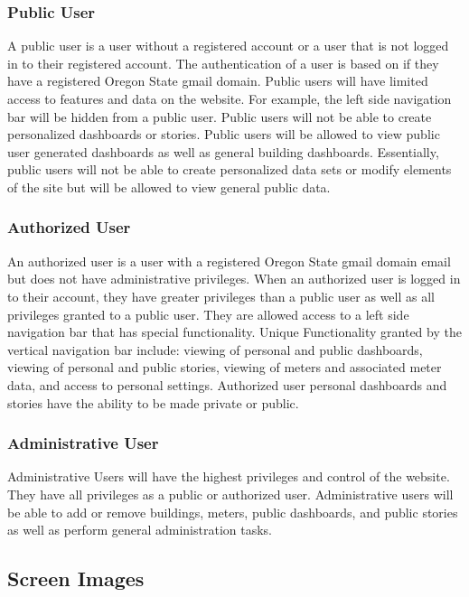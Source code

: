 \documentclass[journal,10pt,onecolumn,compsoc]{IEEEtran}
\begin{document}
	\subsubsection{Public User}
	A public user is a user without a registered account or a user that is not logged in to their registered account. The authentication of a user is based on if 
	they have a registered Oregon State gmail domain. Public users will have limited access to features and data on the website. For example, the left side navigation
	bar will be hidden from a public user. Public users will not be able to create personalized dashboards or stories. Public users will be allowed to view public 
	user generated dashboards as well as general building dashboards. Essentially, public users will not be able to create personalized data sets or modify elements of the site but will be 
	allowed to view general public data. 
	\subsubsection{Authorized User}
	An authorized user is a user with a registered Oregon State gmail domain email but does not have administrative privileges. When an authorized user is logged in 
	to their account, they have greater privileges than a public user as well as all privileges granted to a public user. They are allowed access to a left side navigation 
	bar that has special functionality. Unique Functionality granted by the vertical navigation bar include: viewing of personal and public dashboards, viewing of personal and public
	stories, viewing of meters and associated meter data, and access to personal settings. Authorized user personal dashboards and stories have the ability to be made private or public.
	
	\subsubsection{Administrative User}
	Administrative Users will have the highest privileges and control of the website. They have all privileges as a public or authorized user. Administrative users
	will be able to add or remove buildings, meters, public dashboards, and public stories as well as perform general administration tasks.
	
	
    \subsection{Screen Images}
    \iffalse
    Display screenshots showing the interface from the user’s perspective. These can be
    hand drawn or you can use an automated drawing tool. Just make them as accurate
    as possible. (Graph paper works well.) 
    \fi 
	
\end{document}
